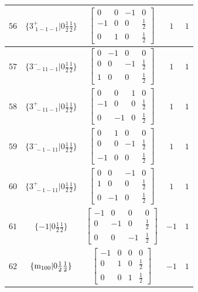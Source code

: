 \documentclass[fleqn,8pt]{jsarticle}
\begin{document}
\begin{longtable}{ccccc}
$ 56 $ & $ \{3^{+}_{\,\,1-1-1}|0 \frac{1}{2} \frac{1}{2}\} $ & $ \begin{bmatrix} 0 & 0 & -1 & 0 \\ -1 & 0 & 0 & \frac{1}{2} \\ 0 & 1 & 0 & \frac{1}{2} \end{bmatrix} $ & $ 1 $ & $ 1 $ \\ \hline
$ 57 $ & $ \{3^{-}_{\,\,-11-1}|0 \frac{1}{2} \frac{1}{2}\} $ & $ \begin{bmatrix} 0 & -1 & 0 & 0 \\ 0 & 0 & -1 & \frac{1}{2} \\ 1 & 0 & 0 & \frac{1}{2} \end{bmatrix} $ & $ 1 $ & $ 1 $ \\ \hline
$ 58 $ & $ \{3^{+}_{\,\,-11-1}|0 \frac{1}{2} \frac{1}{2}\} $ & $ \begin{bmatrix} 0 & 0 & 1 & 0 \\ -1 & 0 & 0 & \frac{1}{2} \\ 0 & -1 & 0 & \frac{1}{2} \end{bmatrix} $ & $ 1 $ & $ 1 $ \\ \hline
$ 59 $ & $ \{3^{-}_{\,\,-1-11}|0 \frac{1}{2} \frac{1}{2}\} $ & $ \begin{bmatrix} 0 & 1 & 0 & 0 \\ 0 & 0 & -1 & \frac{1}{2} \\ -1 & 0 & 0 & \frac{1}{2} \end{bmatrix} $ & $ 1 $ & $ 1 $ \\ \hline
$ 60 $ & $ \{3^{+}_{\,\,-1-11}|0 \frac{1}{2} \frac{1}{2}\} $ & $ \begin{bmatrix} 0 & 0 & -1 & 0 \\ 1 & 0 & 0 & \frac{1}{2} \\ 0 & -1 & 0 & \frac{1}{2} \end{bmatrix} $ & $ 1 $ & $ 1 $ \\ \hline
$ 61 $ & $ \{-1|0 \frac{1}{2} \frac{1}{2}\} $ & $ \begin{bmatrix} -1 & 0 & 0 & 0 \\ 0 & -1 & 0 & \frac{1}{2} \\ 0 & 0 & -1 & \frac{1}{2} \end{bmatrix} $ & $ -1 $ & $ 1 $ \\ \hline
$ 62 $ & $ \{{\rm m}_{100}|0 \frac{1}{2} \frac{1}{2}\} $ & $ \begin{bmatrix} -1 & 0 & 0 & 0 \\ 0 & 1 & 0 & \frac{1}{2} \\ 0 & 0 & 1 & \frac{1}{2} \end{bmatrix} $ & $ -1 $ & $ 1 $ \\ \hline

\end{longtable}
\end{document}
